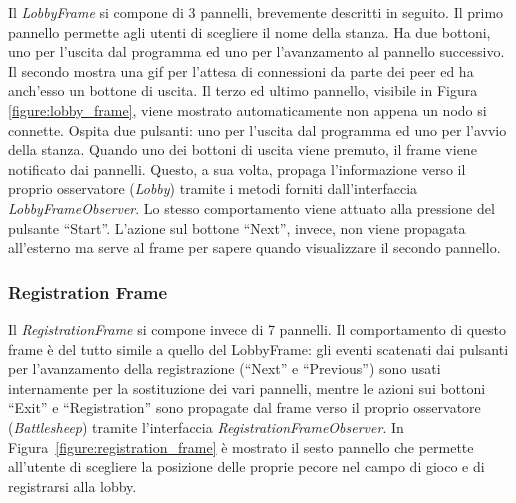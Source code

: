 Il \textit{LobbyFrame} si compone di 3 pannelli, brevemente descritti in seguito. Il primo
pannello permette agli utenti di scegliere il nome della stanza. Ha due bottoni,
uno per l'uscita dal programma ed uno per l'avanzamento al pannello successivo.
Il secondo mostra una gif per l'attesa di connessioni da parte dei peer ed ha
anch'esso un bottone di uscita. Il terzo ed ultimo pannello, visibile in Figura
\ref{figure:lobby_frame}, viene mostrato automaticamente non appena un nodo si
connette. Ospita due pulsanti: uno per l'uscita dal programma ed uno per l'avvio
della stanza.\newline
Quando uno dei bottoni di uscita viene premuto, il frame viene notificato dai pannelli.
Questo, a sua volta, propaga
l'informazione verso il proprio osservatore (\textit{Lobby}) tramite i metodi
forniti dall'interfaccia \textit{LobbyFrameObserver}. Lo stesso comportamento
viene attuato alla pressione del pulsante ``Start''. L'azione sul bottone
``Next'', invece, non viene propagata all'esterno ma serve al frame per sapere
quando visualizzare il secondo pannello.



\subsubsection{Registration Frame}
Il \textit{RegistrationFrame} si compone invece di 7 pannelli.\newline
Il comportamento di questo frame è del tutto simile a quello del LobbyFrame: gli
eventi scatenati dai pulsanti per l'avanzamento della registrazione (``Next'' e
``Previous'') sono usati internamente per la sostituzione dei vari pannelli,
mentre le azioni sui bottoni ``Exit'' e ``Registration'' sono propagate dal
frame verso il proprio osservatore (\textit{Battlesheep}) tramite l'interfaccia
\textit{RegistrationFrameObserver}.\newline
In Figura~\ref{figure:registration_frame} è mostrato il sesto pannello che
permette all'utente di scegliere la posizione delle proprie pecore nel campo di
gioco e di registrarsi alla lobby.



